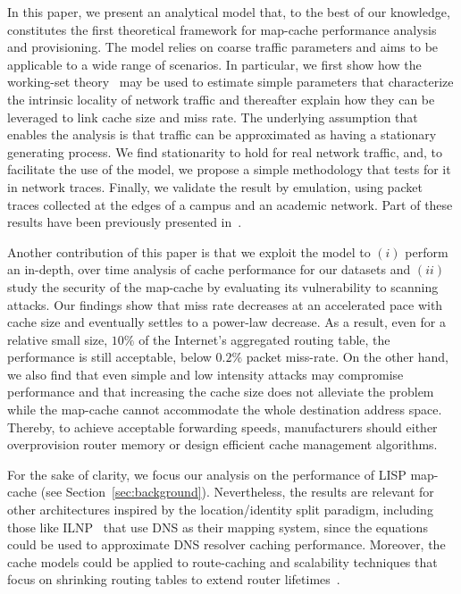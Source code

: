 In this paper, we present an analytical model that, to the best of our
knowledge, constitutes the first theoretical framework for map-cache
performance analysis and provisioning. The model relies on coarse traffic
parameters and aims to be applicable to a wide range of scenarios. In
particular, we first show how the working-set theory~\cite{denning:ws_model} may be
used to estimate simple parameters that characterize the intrinsic locality of network
traffic and thereafter explain how they can be leveraged to link cache size and miss rate. 
The underlying assumption that enables the analysis is that traffic can be
approximated as having a stationary generating process. We find
stationarity to hold for real network traffic, and, to facilitate the use of the model,
we propose a simple methodology that tests for it in network traces.
Finally, we validate the result by emulation, using packet traces collected at
the edges of a campus and an academic network. Part of these results have been
previously presented in~\cite{coras:lcache_n}.







Another contribution of this paper is that we exploit the model to $(i)$
perform an in-depth, over time analysis of cache performance for our datasets
and $(ii)$ study the security of the map-cache by evaluating its vulnerability
to scanning attacks. Our findings show that miss rate decreases at an
accelerated pace with cache size and eventually settles to a power-law
decrease. As a result, even for a relative small size, $10\%$ of the
Internet's aggregated routing table, the performance is still acceptable,
below $0.2\%$ packet miss-rate.
On the other hand, we also find that even simple and low
intensity attacks may compromise performance and that increasing
the cache size does not alleviate the problem while the map-cache cannot
accommodate the whole destination address space. Thereby, to achieve acceptable
forwarding speeds, manufacturers should either overprovision router memory or
design efficient cache management algorithms. 



For the sake of clarity, we focus our analysis on the performance of LISP
map-cache (see Section~\ref{sec:background}). Nevertheless, the results are
relevant for other architectures inspired by the location/identity split
paradigm, including those like ILNP~\cite{RFC6740} that use DNS as their
mapping system, since the equations could be used to approximate DNS resolver
caching performance. Moreover, the cache models could be applied to
route-caching and scalability techniques that focus on shrinking routing
tables to extend router lifetimes~\cite{ballani:viaggre}.

